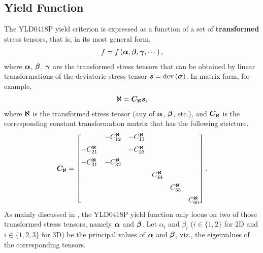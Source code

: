 \subsection{Yield Function}
The YLD0418P yield criterion is expressed as a function of a set of \textbf{transformed} stress tensors, that is, in its most general form,
\begin{gather}
    f=f\left(\bm{\alpha},\bm{\beta},\bm{\gamma},\cdots\right),
\end{gather}
where $\bm{\alpha}$, $\bm{\beta}$, $\bm{\gamma}$ are the transformed stress tensors that can be obtained by linear transformations of the deviatoric stress tensor $\bm{s}=\text{dev}\left(\bm{\sigma}\right)$.
In matrix form, for example,
\begin{gather}
    \bm{\aleph}=\bm{C_\aleph}\bm{s},
\end{gather}
where $\bm{\aleph}$ is the transformed stress tensor (any of $\bm{\alpha}$, $\bm{\beta}$, etc.), and $\bm{C_\aleph}$ is the corresponding constant transformation matrix that has the following stricture.
\begin{gather}
    \bm{C_\aleph}=
    \begin{bmatrix}
                              & -C^{\bm{\aleph}}_{12} & -C^{\bm{\aleph}}_{13} &                      &                      &                      \\[2mm]
        -C^{\bm{\aleph}}_{21} &                       & -C^{\bm{\aleph}}_{23} &                      &                      &                      \\[2mm]
        -C^{\bm{\aleph}}_{31} & -C^{\bm{\aleph}}_{32} &                       &                      &                      &                      \\[2mm]
                              &                       &                       & C^{\bm{\aleph}}_{44} &                      &                      \\[2mm]
                              &                       &                       &                      & C^{\bm{\aleph}}_{55} &                      \\[2mm]
                              &                       &                       &                      &                      & C^{\bm{\aleph}}_{66}
    \end{bmatrix}.
\end{gather}
As mainly discussed in \cite{Barlat2005}, the YLD0418P yield function only focus on two of those transformed stress tensors, namely $\bm{\alpha}$ and $\bm{\beta}$.
Let $\alpha_i$ and $\beta_i$ ($i\in\{1,2\}$ for 2D and $i\in\{1,2,3\}$ for 3D) be the principal values of $\bm{\alpha}$ and $\bm{\beta}$, viz., the eigenvalues of the corresponding tensors.
